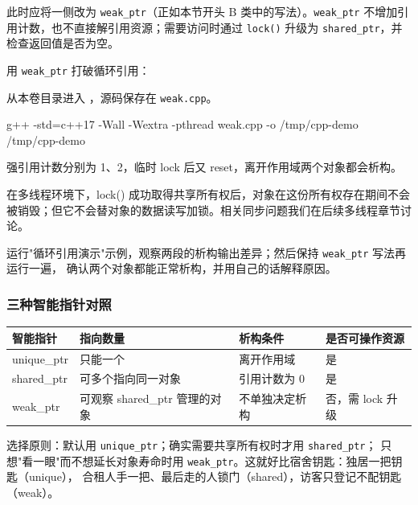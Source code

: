 此时应将一侧改为 \texttt{weak\_ptr}（正如本节开头 B 类中的写法）。\texttt{weak\_ptr} 不增加引用计数，也不直接解引用资源；需要访问时通过 \texttt{lock()} 升级为 \texttt{shared\_ptr}，并检查返回值是否为空。

\begin{example}
用 \texttt{weak\_ptr} 打破循环引用：



从本卷目录进入 ，源码保存在 \texttt{weak.cpp}。
\begin{tbash}
g++ -std=c++17 -Wall -Wextra -pthread weak.cpp -o /tmp/cpp-demo
/tmp/cpp-demo
\end{tbash}
强引用计数分别为 1、2，临时 lock 后又 reset，离开作用域两个对象都会析构。
\end{example}

在多线程环境下，lock() 成功取得共享所有权后，对象在这份所有权存在期间不会被销毁；但它不会替对象的数据读写加锁。相关同步问题我们在后续多线程章节讨论。

\begin{exercise}\label{ex:v1-cpp-weak}

运行"循环引用演示"示例，观察两段的析构输出差异；然后保持 \texttt{weak\_ptr} 写法再运行一遍，
确认两个对象都能正常析构，并用自己的话解释原因。
\end{exercise}

\subsubsection{三种智能指针对照}
\begin{conclusion}
\begin{center}
    \begin{tabular}{p{2.1cm}p{3.2cm}p{3.7cm}p{3.7cm}}
        \toprule[1.5pt]
        智能指针 & 指向数量 & 析构条件 & 是否可操作资源\\
        \midrule[1pt]
        unique\_ptr & 只能一个 & 离开作用域 & 是\\
        shared\_ptr & 可多个指向同一对象 & 引用计数为 0 & 是\\
        weak\_ptr & 可观察 shared\_ptr 管理的对象 & 不单独决定析构 & 否，需 lock 升级\\
        \bottomrule[1.5pt]
    \end{tabular}
\end{center}

选择原则：默认用 \texttt{unique\_ptr}；确实需要共享所有权时才用 \texttt{shared\_ptr}；
只想"看一眼"而不想延长对象寿命时用 \texttt{weak\_ptr}。这就好比宿舍钥匙：独居一把钥匙（unique），
合租人手一把、最后走的人锁门（shared），访客只登记不配钥匙（weak）。
\end{conclusion}

